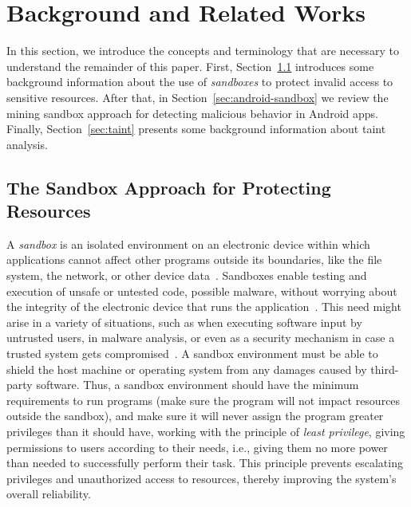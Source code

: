\section{Background and Related Works}


In this section, we introduce the concepts and terminology that are necessary to understand the remainder of this paper. First, Section~\ref{sec:sandbox} introduces some background information about the use of \emph{sandboxes} to protect invalid access to sensitive resources. After that, in Section~\ref{sec:android-sandbox} we review the mining sandbox approach for detecting malicious behavior in Android apps. Finally, Section~\ref{sec:taint} presents some background information about taint analysis.

\subsection{The Sandbox Approach for Protecting Resources}\label{sec:sandbox}

A \emph{sandbox} is an isolated environment on an electronic device within which applications cannot affect other programs outside its boundaries, like the file system, the network, or other device data~\cite{DBLP:journals/peerj-cs/MaassSCS16}. Sandboxes enable testing and execution of unsafe or untested code, possible malware, without worrying about the integrity of the electronic device that runs the application~\cite{DBLP:conf/esorics/BordoniCS17}. This need might arise in a variety of situations, such as when executing software input by untrusted users, in malware analysis, or even as a security mechanism in case a trusted system gets compromised~\cite{DBLP:journals/peerj-cs/MaassSCS16}.
A sandbox environment must be able to shield the host machine or operating system from any damages caused by third-party software. Thus, a sandbox environment should have the minimum requirements to run programs (make sure the program will not impact resources outside the sandbox), and make sure it will never assign the program greater privileges than it should have, working with the principle of \emph{least privilege}, giving permissions to users according to their needs, i.e., giving them no more power than needed to successfully perform their task. This principle prevents escalating privileges and unauthorized access to resources, thereby improving the system's overall reliability.


